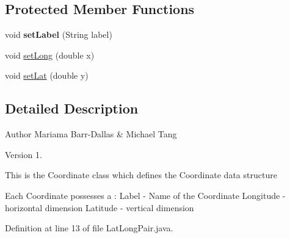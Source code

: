 \subsection*{Protected Member Functions}
\begin{DoxyCompactItemize}
\item 
\hypertarget{classcom_1_1twix_1_1tailoredtravels_1_1_lat_long_pair_a52ca9e22f6dd4ef0e059b517eca384f3}{void {\bfseries set\-Label} (String label)}\label{classcom_1_1twix_1_1tailoredtravels_1_1_lat_long_pair_a52ca9e22f6dd4ef0e059b517eca384f3}

\item 
void \hyperlink{classcom_1_1twix_1_1tailoredtravels_1_1_lat_long_pair_a0eec3e1362c2d480a6fa0dd0bb05f277}{set\-Long} (double x)
\item 
void \hyperlink{classcom_1_1twix_1_1tailoredtravels_1_1_lat_long_pair_a990f96e43c4606cbadab780cd52b57c4}{set\-Lat} (double y)
\end{DoxyCompactItemize}


\subsection{Detailed Description}
\begin{DoxyAuthor}{Author}
Mariama Barr-\/\-Dallas \& Michael Tang 
\end{DoxyAuthor}
\begin{DoxyVersion}{Version}
1. \begin{DoxyVerb}     This is the Coordinate class which defines the Coordinate data
     structure

     Each Coordinate possesses a : Label - Name of the Coordinate
     Longitude - horizontal dimension Latitude - vertical dimension\end{DoxyVerb}
 
\end{DoxyVersion}


Definition at line 13 of file Lat\-Long\-Pair.\-java.



